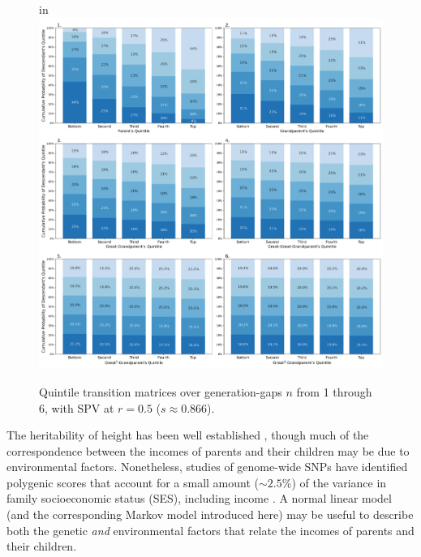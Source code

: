 \documentclass{svproc} %
\begin{document}
\begin{figure}[H]
\centering
\advance{} in
\includegraphics[width=5.2in]{figures/quintile-r=0.5-stable.png} 
\caption{Quintile transition matrices over generation-gaps $n$ from 1 through 6, with SPV at $r = 0.5$ ($s \approx 0.866$).}
\label{fig:quintile_stable}
\end{figure}

The heritability of height has been well established \cite{luo, preece, wood}, though much of the correspondence between the incomes of parents and their children may be due to environmental factors. Nonetheless, studies of genome-wide SNPs have identified polygenic scores that account for a small amount ($\sim 2.5$\%) of the variance in family socioeconomic status (SES), including income \cite{trzaskowski, krapohl}. A normal linear model (and the corresponding Markov model introduced here) may be useful to describe both the genetic \emph{and} environmental factors that relate the incomes of parents and their children.
\end{document}
